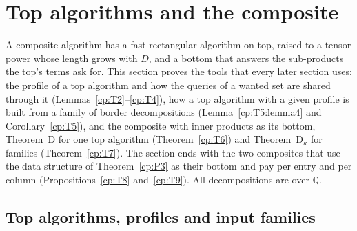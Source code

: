 \documentclass[11pt]{article}
\theoremstyle{definition}
\theoremstyle{remark}
\providecommand{\Q}{\mathbb{Q}}
\newcommand{\ThmD}{Theorem~D}                               %
\newcommand{\ThmDk}{Theorem~D\texorpdfstring{\ensuremath{_\kappa}}{\_kappa}}     %
\begin{document}
\section{Top algorithms and the composite}\label{cp:sec:tops}

A composite algorithm has a fast rectangular algorithm on top, raised to a tensor power whose length grows with $D$, and a bottom that answers the sub-products the top's terms ask for. This section proves the tools that every later section uses: the profile of a top algorithm and how the queries of a wanted set are shared through it (Lemmas~\ref{cp:T2}--\ref{cp:T4}), how a top algorithm with a given profile is built from a family of border decompositions (Lemma~\ref{cp:T5:lemma4} and Corollary~\ref{cp:T5}), and the composite with inner products as its bottom, \ThmD{} for one top algorithm (Theorem~\ref{cp:T6}) and \ThmDk{} for families (Theorem~\ref{cp:T7}). The section ends with the two composites that use the data structure of Theorem~\ref{cp:P3} as their bottom and pay per entry and per column (Propositions~\ref{cp:T8} and~\ref{cp:T9}). All decompositions are over $\Q$.

\subsection{Top algorithms, profiles and input families}\label{cp:sec:profile-def}
\end{document}
